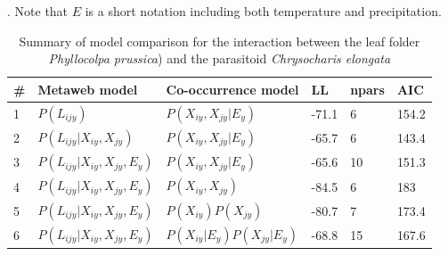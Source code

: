 \documentclass[12pt]{article}
\begin{document}
\newpage
\begin{landscape}
\begin{table}[]
\centering
\caption{Summary of model comparison for the interaction between the leaf
folder \textit{Phyllocolpa prussica}) and the parasitoid \textit{Chrysocharis
elongata}}. Note that $E$ is a short notation including both temperature and precipitation.
\begin{tabular}{llllll}
\hline
	\# & Metaweb model 						& Co-occurrence model 			& LL 	& npars & AIC \\ \hline
	1 & $P(L_{ijy})$ 						& $P(X_{iy},X_{jy}|E_y)$ 		& -71.1 & 6 	& 154.2 \\
	2 & $P(L_{ijy} | X_{iy}, X_{jy})$ 		& $P(X_{iy},X_{jy}|E_y)$ 		& -65.7 & 6 	& 143.4 \\
	3 & $P(L_{ijy} | X_{iy}, X_{jy}, E_y)$ & $P(X_{iy},X_{jy}|E_y)$ 		& -65.6 & 10 	& 151.3 \\ \hline
	4 & $P(L_{ijy} | X_{iy}, X_{jy}, E_y)$ & $P(X_{iy},X_{jy})$ 			& -84.5 & 6 	& 183 \\
	5 & $P(L_{ijy} | X_{iy}, X_{jy}, E_y)$ & $P(X_{iy})P(X_{jy})$ 			& -80.7 & 7 	& 173.4 \\
	6 & $P(L_{ijy} | X_{iy}, X_{jy}, E_y)$ & $P(X_{iy}|E_y)P(X_{jy}|E_y)$ 	& -68.8 & 15 	& 167.6 \\
\hline
\end{tabular}
\end{table}
\end{landscape}

\newpage
\end{document}

